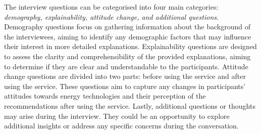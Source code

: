 The interview questions can be categorised into four main categories: \emph{demography, explainability, attitude change, and additional questions}.
Demography questions focus on gathering information about the background of the interviewees, aiming to identify any demographic factors that may influence their interest in more detailed explanations.
Explainability questions are designed to assess the clarity and comprehensibility of the provided explanations, aiming to determine if they are clear and understandable to the participants. 
Attitude change questions are divided into two parts: before using the service and after using the service. 
These questions aim to capture any changes in participants' attitudes towards energy technologies and their perception of the recommendations after using the service.
Lastly, additional questions or thoughts may arise during the interview. 
They could be an opportunity to explore additional insights or address any specific concerns during the conversation. 

